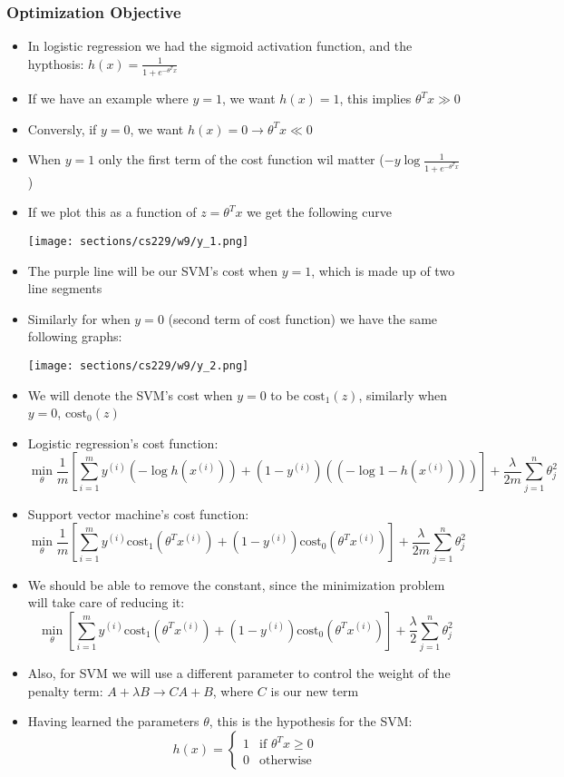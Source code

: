 \subsubsection{Optimization Objective}
\begin{itemize}[--]
	\item In logistic regression we had the sigmoid activation function, and the hypthosis: $h(x)=\frac{1}{1+e^{-\theta^T x}}$
	\item If we have an example where $y=1$, we want $h(x)=1$, this implies $\theta^{T}x \gg 0$
	\item Conversly, if $y=0$, we want $h(x)=0\to \theta^{T}x\ll 0$
	\item When $y=1$ only the first term of the cost function wil matter ($-y\log\frac{1}{1+e^{-\theta^T x}}$)
	\item If we plot this as a function of $z=\theta^T x$ we get the  following curve
	\begin{center}
		\texttt{[image: sections/cs229/w9/y\_1.png]}
	\end{center}
	\item The purple line will be our SVM's cost when $y=1$, which is made up of two line segments

	\item Similarly for when $y=0$ (second term of cost function) we have the same following graphs:
	\begin{center}
		\texttt{[image: sections/cs229/w9/y\_2.png]}
	\end{center}

	\item We will denote the SVM's cost when $y=0$ to be $\text{cost}_1 (z)$, similarly when $y=0$, $\text{cost}_0 (z)$
	\item Logistic regression's cost function:
		$$\min_{\theta}\frac{1}{m} \left[ \sum_{i=1}^{m} y^{(i)} (-\log{h(x^{(i)})}) + (1-y^{(i)})((-\log{1-h(x^{(i)})}))\right] + \frac{\lambda}{2m}\sum_{j=1}^{n}\theta_{j}^{2}$$
	\item Support vector machine's cost function:
		$$\min_{\theta}\frac{1}{m} \left[ \sum_{i=1}^{m} y^{(i)} \text{cost}_1(\theta^{T}x^{(i)}) + (1-y^{(i)})\text{cost}_0 (\theta^{T}x^{(i)})\right] + \frac{\lambda}{2m}\sum_{j=1}^{n}\theta_{j}^{2}$$
	\item We should be able to remove the constant, since the minimization problem will take care of reducing it:
		$$\min_{\theta} \left[ \sum_{i=1}^{m} y^{(i)} \text{cost}_1(\theta^{T}x^{(i)}) + (1-y^{(i)})\text{cost}_0 (\theta^{T}x^{(i)})\right] + \frac{\lambda}{2}\sum_{j=1}^{n}\theta_{j}^{2}$$
	\item Also, for SVM we will use a different parameter to control the weight of the penalty term: $A+\lambda B\to CA+B$, where $C$ is our new term
	\item Having learned the parameters $\theta$, this is the hypothesis for the SVM:
		$$
			h(x)=\begin{cases}
				1 & \text{if } \theta^{T}x\geq 0 \\
				0 & \text{otherwise}
			\end{cases}
		$$
\end{itemize}

